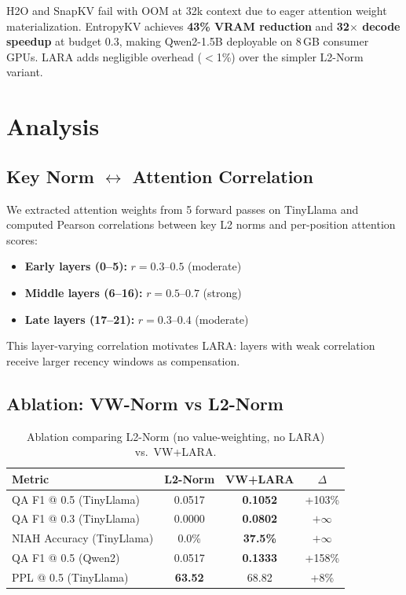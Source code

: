\documentclass{article}
\begin{document}
H2O and SnapKV fail with OOM at 32k context due to eager attention weight materialization. EntropyKV achieves \textbf{43\% VRAM reduction} and \textbf{32$\times$ decode speedup} at budget 0.3, making Qwen2-1.5B deployable on 8\,GB consumer GPUs. LARA adds negligible overhead ($<$1\%) over the simpler L2-Norm variant.

\section{Analysis}

\subsection{Key Norm $\leftrightarrow$ Attention Correlation}
\label{sec:correlation}

We extracted attention weights from 5 forward passes on TinyLlama and computed Pearson correlations between key L2 norms and per-position attention scores:
\begin{itemize}
    \item \textbf{Early layers (0--5):} $r = 0.3$--$0.5$ (moderate)
    \item \textbf{Middle layers (6--16):} $r = 0.5$--$0.7$ (strong)
    \item \textbf{Late layers (17--21):} $r = 0.3$--$0.4$ (moderate)
\end{itemize}

This layer-varying correlation motivates LARA: layers with weak correlation receive larger recency windows as compensation.

\subsection{Ablation: VW-Norm vs L2-Norm}

\begin{table}[h]
\centering
\caption{Ablation comparing L2-Norm (no value-weighting, no LARA) vs.\ VW+LARA.}
\begin{tabular}{lccc}
\toprule
\textbf{Metric} & \textbf{L2-Norm} & \textbf{VW+LARA} & $\Delta$ \\
\midrule
QA F1 @ 0.5 (TinyLlama) & 0.0517 & \textbf{0.1052} & +103\% \\
QA F1 @ 0.3 (TinyLlama) & 0.0000 & \textbf{0.0802} & $+\infty$ \\
NIAH Accuracy (TinyLlama) & 0.0\% & \textbf{37.5\%} & $+\infty$ \\
QA F1 @ 0.5 (Qwen2) & 0.0517 & \textbf{0.1333} & +158\% \\
PPL @ 0.5 (TinyLlama) & \textbf{63.52} & 68.82 & +8\% \\
\bottomrule
\end{tabular}
\end{table}
\end{document}
